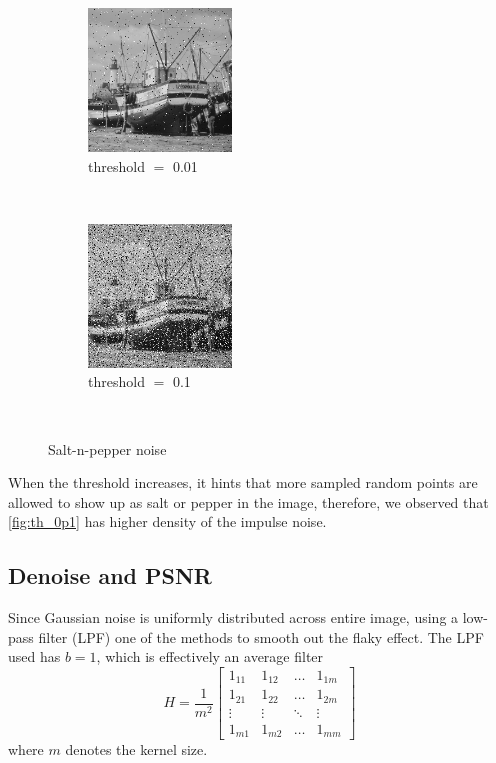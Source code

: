 \documentclass[12pt]{article}
\begin{document}
\begin{figure}[ht!]
    \centering
    \begin{subfigure}[t]{0.3\textwidth}
        \centering
        \includegraphics[height=1.5in]{images/S1}
        \caption{threshold $=$ 0.01}
    \end{subfigure}%
    ~ 
    \begin{subfigure}[t]{0.3\textwidth}
        \centering
        \includegraphics[height=1.5in]{images/S2}
        \caption{threshold $=$ 0.1}
        \label{fig:th_0p1}
    \end{subfigure}%
    ~
    \caption{Salt-n-pepper noise}
\end{figure}
When the threshold increases, it hints that more sampled random points are allowed to show up as salt or pepper in the image, therefore, we observed that \autoref{fig:th_0p1} has higher density of the impulse noise.

\newpage

\subsection*{Denoise and PSNR}
Since Gaussian noise is uniformly distributed across entire image, using a low-pass filter (LPF) one of the methods to smooth out the flaky effect.
The LPF used has $b=1$, which is effectively an average filter
\begin{equation*}
	H = \frac{1}{m^2} \begin{bmatrix}
	    1_{11} & 1_{12} & \dots  & 1_{1m} \\
	    1_{21} & 1_{22} & \dots  & 1_{2m} \\
	    \vdots & \vdots & \ddots & \vdots \\
	    1_{m1} & 1_{m2} & \dots  & 1_{mm}
	\end{bmatrix}
\end{equation*}
where $m$ denotes the kernel size.
\end{document}
